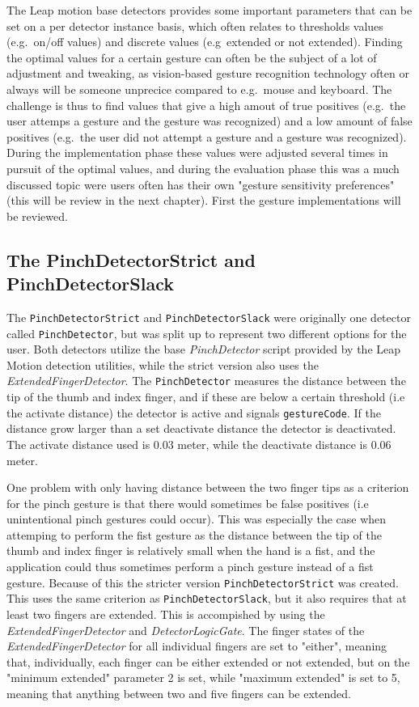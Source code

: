 The Leap motion base detectors provides some important parameters that can be set on a per detector instance basis, which often relates to thresholds values (e.g.~on/off values) and discrete
values (e.g~extended or not extended). Finding the optimal values for a certain gesture can often be the subject of a lot of adjustment and tweaking, as vision-based gesture recognition
technology often or always will be someone unprecice compared to e.g.~mouse and keyboard. The challenge is thus to find values that give a high amout of true positives (e.g.~the user attemps a gesture
and the gesture was recognized) and a low amount of false positives (e.g.~the user did not attempt a gesture and a gesture was recognized). 
During the implementation phase these values were adjusted several times in pursuit of the optimal values, and during the evaluation phase this was a much discussed topic were users often 
has their own "gesture sensitivity preferences" (this will be review in the next chapter). First the gesture implementations will be reviewed. 


\subsection{The PinchDetectorStrict and PinchDetectorSlack}
The \texttt{PinchDetectorStrict} and \texttt{PinchDetectorSlack} were originally one detector called \texttt{PinchDetector}, but was split up to represent two 
different options for the user. Both detectors utilize the base \textit{PinchDetector} script provided by the Leap Motion detection utilities, while the strict version
also uses the \textit{ExtendedFingerDetector}. The \texttt{PinchDetector} measures the distance between the tip of the thumb and index finger, and if these are below
a certain threshold (i.e the activate distance) the detector is active and signals \texttt{gestureCode}. If the distance grow larger than a set deactivate distance
the detector is deactivated. The activate distance used is 0.03 meter, while the deactivate distance is 0.06 meter. 

One problem with only having distance between the two finger tips as a criterion for the pinch gesture is that there would sometimes be false positives 
(i.e unintentional pinch gestures could occur). This was especially the case when attemping to perform the fist gesture as the distance between the tip of the
thumb and index finger is relatively small when the hand is a fist, and the application could thus sometimes perform a pinch gesture instead of a fist gesture.
Because of this the stricter version \texttt{PinchDetectorStrict} was created. This uses the same criterion as \texttt{PinchDetectorSlack}, but it also requires
that at least two fingers are extended. This is accompished by using the \textit{ExtendedFingerDetector} and \textit{DetectorLogicGate}. 
The finger states of the \textit{ExtendedFingerDetector} for all individual fingers are set to "either", meaning that, individually, each finger can 
be either extended or not extended, but on the "minimum extended" parameter 2 is set, while "maximum extended" is set to 5, 
meaning that anything between two and five fingers can be extended. 

